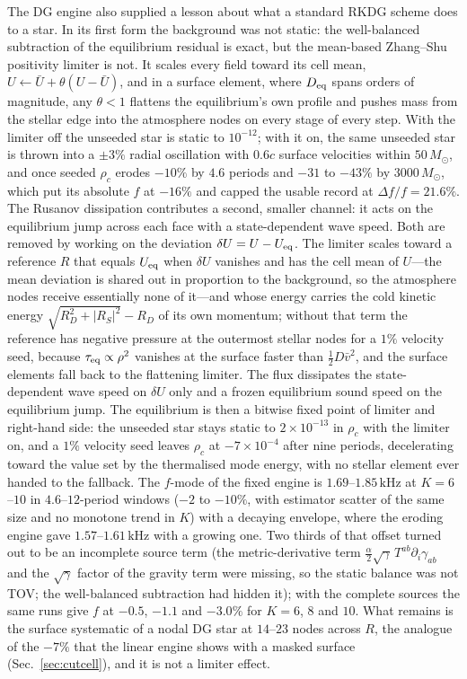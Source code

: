 \documentclass[aps,prd,reprint,amsmath,amssymb,nofootinbib,longbibliography,superscriptaddress]{revtex4-2}
\newcommand{\Msun}{M_\odot}
\newcommand{\kHz}{\,\mathrm{kHz}}
\begin{document}
The DG engine also supplied a lesson about what a standard RKDG scheme does to a star. In its
first form the background was not static: the well-balanced subtraction of the equilibrium
residual is exact, but the mean-based Zhang--Shu positivity limiter is not. It scales every field
toward its cell mean, $U \leftarrow \bar U + \theta(U-\bar U)$, and in a surface element, where
$D_{\rm eq}$ spans orders of magnitude, any $\theta<1$ flattens the equilibrium's own profile and
pushes mass from the stellar edge into the atmosphere nodes on every stage of every step. With the
limiter off the unseeded star is static to $10^{-12}$; with it on, the same unseeded star is
thrown into a $\pm3\%$ radial oscillation with $0.6c$ surface velocities within $50\,\Msun$, and
once seeded $\rho_c$ erodes $-10\%$ by $4.6$ periods and $-31$ to $-43\%$ by $3000\,\Msun$, which
put its absolute $f$ at $-16\%$ and capped the usable record at $\Delta f/f = 21.6\%$. The
Rusanov dissipation contributes a second, smaller channel: it acts on the equilibrium jump across
each face with a state-dependent wave speed. Both are removed by working on the deviation
$\delta U = U - U_{\rm eq}$. The limiter scales toward a reference $R$ that equals $U_{\rm eq}$
when $\delta U$ vanishes and has the cell mean of $U$---the mean deviation is shared out in
proportion to the background, so the atmosphere nodes receive essentially none of it---and whose
energy carries the cold kinetic energy $\sqrt{R_D^2+|R_S|^2}-R_D$ of its own momentum; without
that term the reference has negative pressure at the outermost stellar nodes for a $1\%$ velocity
seed, because $\tau_{\rm eq}\propto\rho^2$ vanishes at the surface faster than $\tfrac12 D\bar v^2$,
and the surface elements fall back to the flattening limiter. The flux dissipates the
state-dependent wave speed on $\delta U$ only and a frozen equilibrium sound speed on the
equilibrium jump. The equilibrium is then a bitwise fixed point of limiter and right-hand side:
the unseeded star stays static to $2\times10^{-13}$ in $\rho_c$ with the limiter on, and a $1\%$
velocity seed leaves $\rho_c$ at $-7\times10^{-4}$ after nine periods, decelerating toward the
value set by the thermalised mode energy, with no stellar element ever handed to the fallback.
The $f$-mode of the fixed engine is $1.69$--$1.85\kHz$ at $K=6$--$10$ in $4.6$--$12$-period
windows ($-2$ to $-10\%$, with estimator scatter of the same size and no monotone trend in $K$)
with a decaying envelope, where the eroding engine gave $1.57$--$1.61\kHz$ with a growing one.
Two thirds of that offset turned out to be an incomplete source term (the metric-derivative
term $\tfrac{\alpha}{2}\sqrt\gamma\,T^{ab}\partial_i\gamma_{ab}$ and the $\sqrt\gamma$ factor of
the gravity term were missing, so the static balance was not TOV; the well-balanced subtraction
had hidden it); with the complete sources the same runs give $f$ at $-0.5$, $-1.1$ and $-3.0\%$
for $K=6$, $8$ and $10$. What remains is the surface systematic of a nodal DG star at $14$--$23$
nodes across $R$, the analogue of the $-7\%$ that the linear engine shows with a masked surface
(Sec.~\ref{sec:cutcell}), and it is not a limiter effect.
\end{document}
